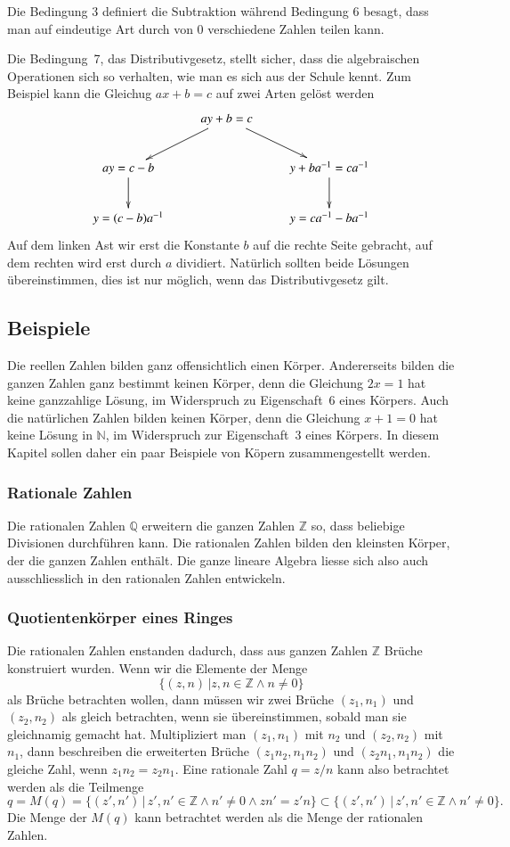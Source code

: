 Die Bedingung 3 definiert die Subtraktion während Bedingung 6
besagt, dass man auf eindeutige Art durch von $0$ verschiedene
Zahlen teilen kann.

Die Bedingung~7, das Distributivgesetz, stellt sicher,
dass die algebraischen Operationen
sich so verhalten, wie man es sich aus der Schule kennt.
Zum Beispiel kann die Gleichug $ax+b=c$ auf zwei Arten gelöst werden
\begin{align*}
\xymatrix{
\txt{}	&{ay+b=c}\ar[dr]\ar[dl]
\\
ay=c-b \ar[d]	&\txt{}	&y+ba^{-1}=ca^{-1}\ar[d]
\\
y=(c-b)a^{-1}&\txt{}&	y=ca^{-1}-ba^{-1}
}
\end{align*}
Auf dem linken Ast wir erst die Konstante $b$ auf die rechte Seite
gebracht, auf dem rechten wird erst durch $a$ dividiert.
Natürlich sollten beide Lösungen übereinstimmen, dies ist nur möglich,
wenn das Distributivgesetz gilt.

\subsection{Beispiele}
Die reellen Zahlen bilden ganz offensichtlich einen Körper.
Andererseits bilden die ganzen Zahlen ganz bestimmt keinen Körper,
denn die Gleichung $2x=1$ hat keine ganzzahlige Lösung, im Widerspruch
zu Eigenschaft~6 eines Körpers.
Auch die natürlichen Zahlen bilden keinen Körper, denn die Gleichung
$x+1=0$ hat keine Lösung in $\mathbb N$, im Widerspruch zur Eigenschaft~3
eines Körpers.
In diesem Kapitel sollen daher ein paar Beispiele von Köpern
zusammengestellt werden.

\subsubsection{Rationale Zahlen}
Die rationalen Zahlen $\mathbb Q$ erweitern die ganzen Zahlen $\mathbb Z$
so, dass beliebige Divisionen durchführen kann.
Die rationalen Zahlen bilden den kleinsten Körper, der die ganzen
Zahlen enthält.
Die ganze lineare Algebra liesse sich also auch ausschliesslich in
den rationalen Zahlen entwickeln.

\subsubsection{Quotientenkörper eines Ringes}
Die rationalen Zahlen enstanden dadurch, dass aus ganzen Zahlen $\mathbb Z$
Brüche konstruiert wurden.
Wenn wir die Elemente der Menge
\[
\{ (z,n)\,| z,n\in\mathbb Z\wedge n\ne 0\}
\]
als Brüche betrachten wollen, dann müssen wir zwei Brüche
$(z_1,n_1)$ und $(z_2,n_2)$ als gleich betrachten, wenn sie
übereinstimmen, sobald man sie gleichnamig gemacht hat.
Multipliziert man $(z_1,n_1)$ mit $n_2$ und $(z_2,n_2)$ mit $n_1$, dann
beschreiben die erweiterten Brüche
$(z_1n_2,n_1n_2)$ und $(z_2n_1,n_1n_2)$ die gleiche Zahl, wenn
$z_1n_2=z_2n_1$.
Eine rationale Zahl $q=z/n$ kann also betrachtet werden als die
Teilmenge
\[
q
=
M(q)
=
\{(z',n')\,|\, z',n'\in\mathbb Z\wedge n'\ne 0 \wedge zn'=z'n\}
\subset
\{(z',n')\,|\, z',n'\in\mathbb Z\wedge n'\ne 0\}.
\]
Die Menge der $M(q)$ kann betrachtet werden als die Menge der rationalen
Zahlen.

